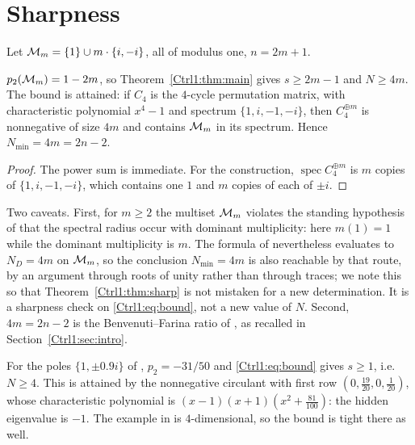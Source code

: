 \section{Sharpness}\label{Ctrl1:sec:sharp}

Let $\mathcal{M}_m=\{1\}\cup m\cdot\{i,-i\}$, all of modulus one, $n=2m+1$.

\begin{theorem}\label{Ctrl1:thm:sharp}
$p_2(\mathcal{M}_m)=1-2m$, so Theorem~\ref{Ctrl1:thm:main} gives $s\ge2m-1$ and $N\ge4m$. The bound is
attained: if $C_4$ is the $4$-cycle permutation matrix, with characteristic polynomial
$x^{4}-1$ and spectrum $\{1,i,-1,-i\}$, then $C_4^{\oplus m}$ is nonnegative of size $4m$
and contains $\mathcal{M}_m$ in its spectrum. Hence $N_{\min}=4m=2n-2$.
\end{theorem}

\begin{proof}
The power sum is immediate. For the construction, $\operatorname{spec}C_4^{\oplus m}$ is
$m$ copies of $\{1,i,-1,-i\}$, which contains one $1$ and $m$ copies of each of $\pm i$.
\end{proof}

\begin{remark}\label{Ctrl1:rem:caveat}
Two caveats. First, for $m\ge2$ the multiset $\mathcal{M}_m$ violates the standing hypothesis of
\cite[Thms.~3.2, 4.1]{Ben20ELA} that the spectral radius occur with dominant multiplicity:
here $m(1)=1$ while the dominant multiplicity is $m$. The formula of
\cite[Thm.~4.1]{Ben20ELA} nevertheless evaluates to $N_D=4m$ on $\mathcal{M}_m$, so the conclusion
$N_{\min}=4m$ is also reachable by that route, by an argument through roots of unity rather
than through traces; we note this so that Theorem~\ref{Ctrl1:thm:sharp} is not mistaken for a new
determination. It is a sharpness check on \eqref{Ctrl1:eq:bound}, not a new value of $N$. Second,
$4m=2n-2$ is the Benvenuti--Farina ratio of \cite{BF99}, as recalled in
Section~\ref{Ctrl1:sec:intro}.
\end{remark}

\begin{remark}\label{Ctrl1:rem:ex8}
For the poles $\{1,\pm0.9i\}$ of \cite[Ex.~8]{BF04}, $p_2=-31/50$ and \eqref{Ctrl1:eq:bound}
gives $s\ge1$, i.e.\ $N\ge4$. This is attained by the nonnegative circulant with first row
$(0,\tfrac{19}{20},0,\tfrac1{20})$, whose characteristic polynomial is
$(x-1)(x+1)(x^{2}+\tfrac{81}{100})$: the hidden eigenvalue is $-1$. The example in
\cite{BF04} is $4$-dimensional, so the bound is tight there as well.
\end{remark}

